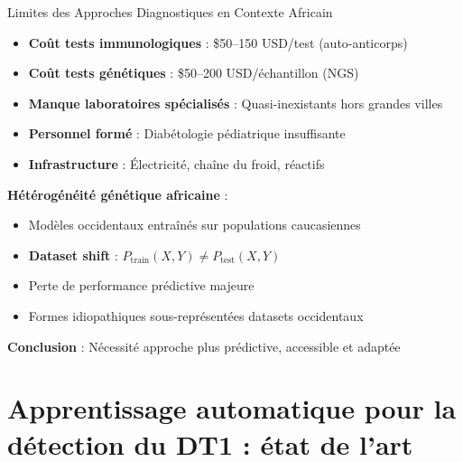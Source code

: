 \documentclass[11pt, aspectratio=169]{beamer}
\begin{document}
\begin{frame}{Limites des Approches Diagnostiques en Contexte Africain}
  \begin{tcolorbox}[colback=accent1!15, title=\textbf{\small Barrières systémiques majeures}]
    \begin{itemize}
      \item \textbf{Coût tests immunologiques} : \$50--150 USD/test (auto-anticorps)
      \item \textbf{Coût tests génétiques} : \$50--200 USD/échantillon (NGS)
      \item \textbf{Manque laboratoires spécialisés} : Quasi-inexistants hors grandes villes
      \item \textbf{Personnel formé} : Diabétologie pédiatrique insuffisante
      \item \textbf{Infrastructure} : Électricité, chaîne du froid, réactifs
    \end{itemize}
  \end{tcolorbox}
  
  \vspace{0.8em}
  
  \textbf{\textcolor{accent1}{Hétérogénéité génétique africaine}} :
  \begin{itemize}
    \item Modèles occidentaux entraînés sur populations caucasiennes
    \item \textbf{Dataset shift} : $P_{\text{train}}(X, Y) \neq P_{\text{test}}(X, Y)$
    \item Perte de performance prédictive majeure
    \item Formes idiopathiques sous-représentées datasets occidentaux
  \end{itemize}
  
  \vspace{0.6em}
  
  \textbf{\textcolor{accent2}{Conclusion}} : Nécessité approche plus prédictive, accessible et adaptée
\end{frame}

\section{Apprentissage automatique pour la détection du DT1 : état de l'art}
\end{document}
